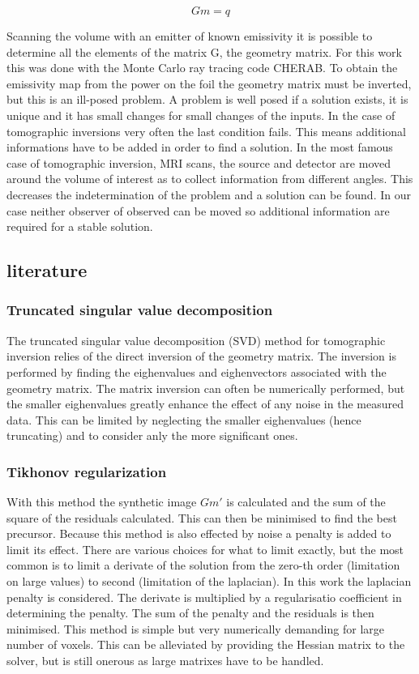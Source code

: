 \begin{equation}
Gm=q
\label{eq:gmq}
\end{equation}

Scanning the volume with an emitter of known emissivity it is possible to determine all the elements of the matrix G, the geometry matrix. For this work this was done with the Monte Carlo ray tracing code CHERAB. To obtain the emissivity map from the power on the foil the geometry matrix must be inverted, but this is an ill-posed problem. A problem is well posed if a solution exists, it is unique and it has small changes for small changes of the inputs. \cite{Hansen1998} In the case of tomographic inversions very often the last condition fails. \cite{Hansen2010} This means additional informations have to be added in order to find a solution. In the most famous case of tomographic inversion, MRI scans, the source and detector are moved around the volume of interest as to collect information from different angles. This decreases the indetermination of the problem and a solution can be found. In our case neither observer of observed can be moved so additional information are required for a stable solution.
\subsection{literature}
\subsubsection{Truncated singular value decomposition}
The truncated singular value decomposition (SVD) method for tomographic inversion relies of the direct inversion of the geometry matrix. The inversion is performed by finding the eighenvalues and eighenvectors associated with the geometry matrix. The matrix inversion can often be numerically performed, but the smaller eighenvalues greatly enhance the effect of any noise in the measured data. This can be limited by neglecting the smaller eighenvalues (hence truncating) and to consider anly the more significant ones.
\subsubsection{Tikhonov regularization}
With this method the synthetic image $Gm'$ is calculated and the sum of the square of the residuals calculated. This can then be minimised to find the best precursor. Because this method is also effected by noise a penalty is added to limit its effect. There are various choices for what to limit exactly, but the most common is to limit a derivate of the solution from the zero-th order (limitation on large values) to second (limitation of the laplacian). In this work the laplacian penalty is considered. The derivate is multiplied by a regularisatio coefficient in determining the penalty. The sum of the penalty and the residuals is then minimised. \cite{Schou2015} This method is simple but very numerically demanding for large number of voxels. This can be alleviated by providing the Hessian matrix to the solver, but is still onerous as large matrixes have to be handled.
